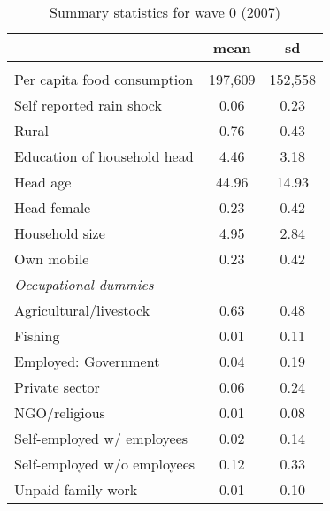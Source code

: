 \begin{table}[htbp] 
  \centering
  \caption{Summary statistics for wave 0 (2007)} \label{placebo_sum}
    \begin{tabular}{lcc}
    \toprule
          & mean  & sd \\
    \midrule
    \\
    Per capita food consumption & 197,609 & 152,558 \\
    Self reported rain shock & 0.06  & 0.23 \\
    Rural & 0.76  & 0.43 \\
    Education of household head & 4.46  & 3.18 \\
    Head age & 44.96 & 14.93 \\
    Head female & 0.23  & 0.42 \\
    Household size & 4.95  & 2.84 \\
    Own mobile & 0.23  & 0.42 \\
    \textit{Occupational dummies} & \\
    Agricultural/livestock & 0.63  & 0.48 \\
    Fishing & 0.01  & 0.11 \\
    Employed: Government & 0.04  & 0.19 \\
    Private sector & 0.06  & 0.24 \\
    NGO/religious & 0.01  & 0.08 \\
    Self-employed w/ employees & 0.02  & 0.14 \\
    Self-employed w/o employees & 0.12  & 0.33 \\
    Unpaid family work & 0.01  & 0.10 \\
    
    \bottomrule
    \end{tabular}%
  \label{tab:addlabel}%
\end{table}